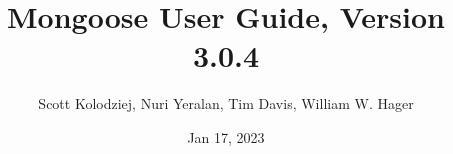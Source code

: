 \title{Mongoose User Guide, Version 3.0.4}
\author{Scott Kolodziej, Nuri Yeralan, Tim Davis, William W. Hager}
\date{Jan 17, 2023}
